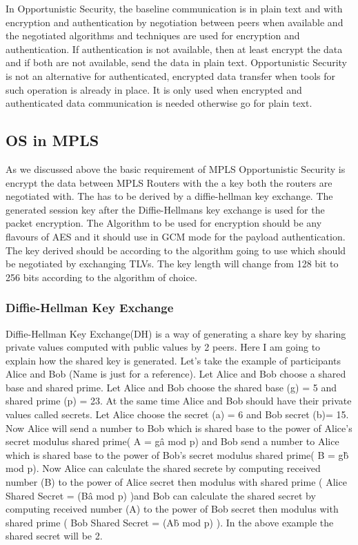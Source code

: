 In Opportunistic Security, the baseline communication is in plain text and with encryption and authentication by negotiation between peers when available and the negotiated algorithms and techniques are used for encryption and authentication. If authentication is not available, then at least encrypt the data and if both are not available, send the data in plain text. Opportunistic Security is not an alternative for authenticated, encrypted data transfer when tools for such operation is already in place. It is only used when encrypted and authenticated data communication is needed otherwise go for plain text.

\subsection{OS in MPLS} 

As we discussed above the basic requirement of MPLS Opportunistic Security\cite{__2017} is encrypt the data between MPLS Routers with the a key both the routers are negotiated with. The has to be derived by a diffie-hellman key exchange. The generated session key after the Diffie-Hellmans key exchange is used for the packet encryption. The Algorithm to be used for encryption should be any flavours of AES and it should use in GCM mode for the payload authentication. The key derived should be according to the algorithm going to use which should be negotiated by exchanging TLVs.  The key length will change from 128 bit to 256 bits according to the algorithm of choice.


\subsubsection{Diffie-Hellman Key Exchange} 

Diffie-Hellman Key Exchange(DH)\cite{just}\cite{rescorla_1999} is a way of generating a share key by sharing private values computed with public values by 2 peers. Here I am going to explain how the shared key is generated.
Let’s take  the example of participants  Alice and Bob (Name is just for a reference). Let Alice and Bob choose a shared base and shared prime. Let Alice and Bob choose the shared base (g) = 5 and shared prime (p) = 23. At the same time Alice and Bob should have their private values called secrets. Let Alice choose the secret (a) = 6 and Bob secret (b)= 15. Now Alice will send a number  to Bob which is shared base to the power of Alice’s secret modulus shared prime( A = g\^a mod p) and Bob send a number to Alice which is shared base to the power of Bob’s secret modulus shared prime( B = g\^b mod p). Now Alice can calculate the shared secrete by computing  received number (B) to the power of Alice secret then modulus with shared prime ( Alice Shared Secret = (B\^a mod p) )and Bob can calculate the shared secret by computing received number (A) to the power of Bob secret then modulus with shared prime ( Bob Shared Secret = (A\^b mod p) ). In the above example the shared secret will be 2.

